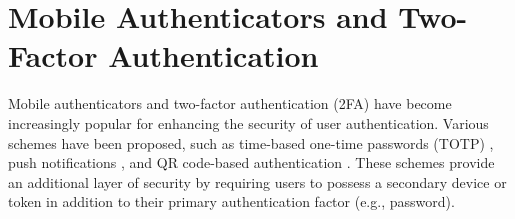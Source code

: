 \section{Mobile Authenticators and Two-Factor Authentication}
Mobile authenticators and two-factor authentication (2FA) have become increasingly popular for enhancing the security of user authentication. Various schemes have been proposed, such as time-based one-time passwords (TOTP) \cite{mraihi2011totp}, push notifications \cite{reese2019usability}, and QR code-based authentication \cite{liao2010novel}. These schemes provide an additional layer of security by requiring users to possess a secondary device or token in addition to their primary authentication factor (e.g., password).
